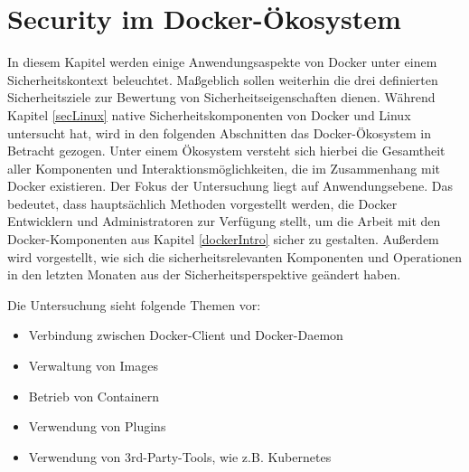\documentclass[../main.tex]{subfiles}
\begin{document}



\chapter{Security im Docker-Ökosystem}
\label{secEcosystem}
  In diesem Kapitel werden einige Anwendungsaspekte von Docker unter einem Sicherheitskontext beleuchtet. Maßgeblich sollen weiterhin die drei definierten Sicherheitsziele zur Bewertung von Sicherheitseigenschaften dienen. Während Kapitel \ref{secLinux} native Sicherheitskomponenten von Docker und Linux untersucht hat, wird in den folgenden Abschnitten das Docker-Ökosystem in Betracht gezogen. Unter einem Ökosystem versteht sich hierbei die Gesamtheit aller Komponenten und Interaktionsmöglichkeiten, die im Zusammenhang mit Docker existieren. Der Fokus der Untersuchung liegt auf Anwendungsebene. Das bedeutet, dass hauptsächlich Methoden vorgestellt werden, die Docker Entwicklern und Administratoren zur Verfügung stellt, um die Arbeit mit den Docker-Komponenten aus Kapitel \ref{dockerIntro} sicher zu gestalten. Außerdem wird vorgestellt, wie sich die sicherheitsrelevanten Komponenten und Operationen in den letzten Monaten aus der Sicherheitsperspektive geändert haben.


  Die Untersuchung sieht folgende Themen vor:

  \begin{itemize}
    \item Verbindung zwischen Docker-Client und Docker-Daemon
    \item Verwaltung von Images
    \item Betrieb von Containern
    \item Verwendung von Plugins
    \item Verwendung von 3rd-Party-Tools, wie z.B. Kubernetes
  \end{itemize}
\end{document}
